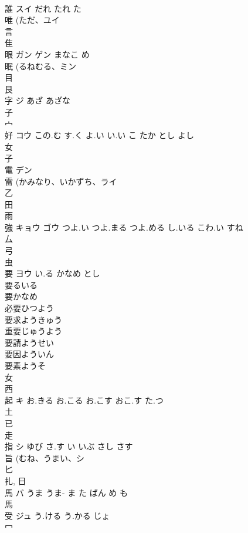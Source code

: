 \documentclass[8pt]{extreport}
\begin{document}
\begin{CJK}{UTF8}{min}
\\	誰	スイ	だれ たれ た	
\\	唯 (ただ、ユイ 
\\	言 
\\	隹 
\\	眼	ガン ゲン	まなこ め	
\\	眠 (るねむる、ミン 
\\	目 
\\	艮 
\\	字	ジ	あざ あざな	
\\	子 
\\	宀 
\\	好	コウ	この.む す.く よ.い い.い こ たか とし よし	
\\	女 
\\	子 
\\	電	デン		
\\	雷 (かみなり、いかずち、ライ 
\\	乙 
\\	田 
\\	雨 
\\	強	キョウ ゴウ	つよ.い つよ.まる つよ.める し.いる こわ.い すね	
\\	厶 
\\	弓 
\\	虫 
\\	要	ヨウ	い.る かなめ とし	
\\	要るいる 
\\	要かなめ 
\\	必要ひつよう 
\\	要求ようきゅう 
\\	重要じゅうよう 
\\	要請ようせい 
\\	要因よういん 
\\	要素ようそ 
\\	女 
\\	西 
\\	起	キ	お.きる お.こる お.こす おこ.す た.つ	
\\	土 
\\	已 
\\	走 
\\	指	シ	ゆび さ.す い いぶ さし さす	
\\	旨 (むね、うまい、シ 
\\	匕 
\\	扎, 日 
\\	馬	バ	うま うま- ま た ばん め も	
\\	馬 
\\	受	ジュ	う.ける う.かる じょ	
\\	冖 

\end{CJK}
\end{document}
